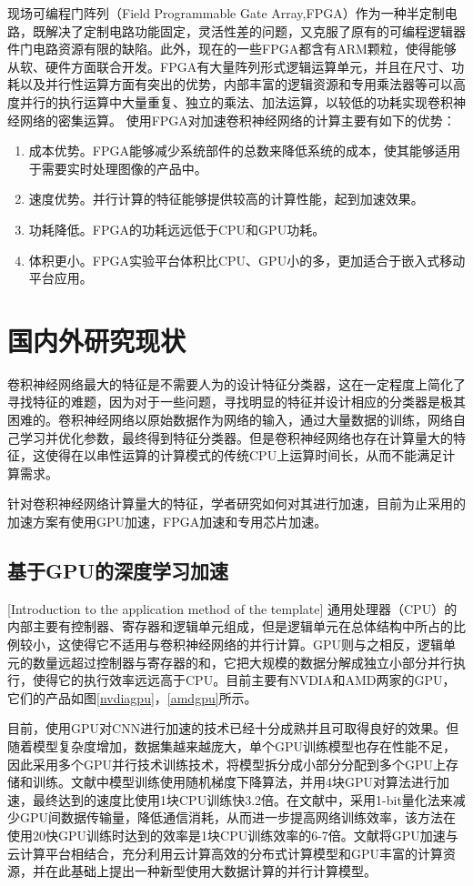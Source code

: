 现场可编程门阵列（Field Programmable Gate Array,FPGA）作为一种半定制电路，既解决了定制电路功能固定，灵活性差的问题，又克服了原有的可编程逻辑器件门电路资源有限的缺陷。此外，现在的一些FPGA都含有ARM颗粒，使得能够从软、硬件方面联合开发。FPGA有大量阵列形式逻辑运算单元，并且在尺寸、功耗以及并行性运算方面有突出的优势，内部丰富的逻辑资源和专用乘法器等可以高度并行的执行运算中大量重复、独立的乘法、加法运算，以较低的功耗实现卷积神经网络的密集运算。
	使用FPGA对加速卷积神经网络的计算主要有如下的优势：
\begin{enumerate}
	\item 成本优势。FPGA能够减少系统部件的总数来降低系统的成本，使其能够适用于需要实时处理图像的产品中。
	\item 速度优势。并行计算的特征能够提供较高的计算性能，起到加速效果。
	\item 功耗降低。FPGA的功耗远远低于CPU和GPU功耗。
	\item 体积更小。FPGA实验平台体积比CPU、GPU小的多，更加适合于嵌入式移动平台应用。
\end{enumerate}

\section{国内外研究现状}
卷积神经网络最大的特征是不需要人为的设计特征分类器，这在一定程度上简化了寻找特征的难题，因为对于一些问题，寻找明显的特征并设计相应的分类器是极其困难的。卷积神经网络以原始数据作为网络的输入，通过大量数据的训练，网络自己学习并优化参数，最终得到特征分类器。但是卷积神经网络也存在计算量大的特征，这使得在以串性运算的计算模式的传统CPU上运算时间长，从而不能满足计算需求\cite{cevher2014convex}。

针对卷积神经网络计算量大的特征，学者研究如何对其进行加速，目前为止采用的加速方案有使用GPU加速，FPGA加速\cite{huang2014}和专用芯片加速。

\subsection{基于GPU的深度学习加速}[Introduction to the application method of the template]
通用处理器（CPU）的内部主要有控制器、寄存器和逻辑单元组成，但是逻辑单元在总体结构中所占的比例较小\cite{shen2007compute}，这使得它不适用与卷积神经网络的并行计算。GPU则与之相反，逻辑单元的数量远超过控制器与寄存器的和，它把大规模的数据分解成独立小部分并行执行，使得它的执行效率远远高于CPU。目前主要有NVDIA和AMD两家的GPU，它们的产品如图\ref{nvdiagpu}，\ref{amdgpu}所示。

目前，使用GPU对CNN进行加速的技术已经十分成熟并且可取得良好的效果\cite{abdel2012applying}。但随着模型复杂度增加，数据集越来越庞大，单个GPU训练模型也存在性能不足，因此采用多个GPU并行技术训练技术，将模型拆分成小部分分配到多个GPU上存储和训练\cite{wang2017mul}。文献\cite{zhang2013asynchronous}中模型训练使用随机梯度下降算法，并用4块GPU对算法进行加速，最终达到的速度比使用1块CPU训练快3.2倍。在文献\cite{seide20141}中，采用1-bit量化法来减少GPU间数据传输量，降低通信消耗，从而进一步提高网络训练效率，该方法在使用20快GPU训练时达到的效率是1块CPU训练效率的6-7倍。文献\cite{xu2015}将GPU加速与云计算平台相结合，充分利用云计算高效的分布式计算模型和GPU丰富的计算资源，并在此基础上提出一种新型使用大数据计算的并行计算模型。

